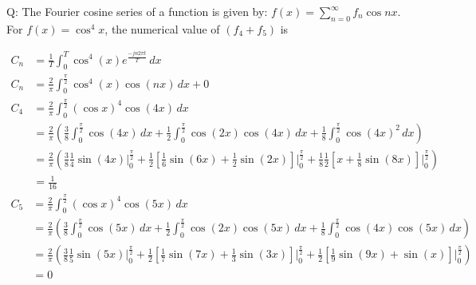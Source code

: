 \documentclass[journal,12pt,onecolumn]{IEEEtran}
\theoremstyle{remark}
\begin{document}
\let\vec\mathbf







\bigskip


Q: The Fourier cosine series of a function is given by: $f(x) = \sum_{n=0}^{\infty} f_{n}\cos{nx}$. For $f(x) = \cos^{4}x$, the numerical value of $(f_{4} + f_{5})$ is
 
\solution
\begin{table}[h]

\end{table}
\begin{align}
C_n &= \frac{1}{T} \int_{0}^{T} \cos^4(x) e^{\frac{-jn2\pi t}{T}} \,dx \\
    C_n &= \frac{2}{\pi} \int_{0}^{\frac{\pi}{2}} \cos^4(x) \cos(nx) \,dx + 0 \\
   C_4 &= \frac{2}{\pi} \int_{0}^{\frac{\pi}{2}} (\cos x)^4 \cos(4x) \, dx \\
&= \frac{2}{\pi} \left( \frac{3}{8} \int_{0}^{\frac{\pi}{2}} \cos(4x) \, dx + \frac{1}{2} \int_{0}^{\frac{\pi}{2}} \cos(2x) \cos(4x) \, dx + \frac{1}{8} \int_{0}^{\frac{\pi}{2}} \cos(4x)^2 \, dx \right) \\
&= \frac{2}{\pi} \left( \frac{3}{8} \frac{1}{4} \sin(4x) \Bigg|_{0}^{\frac{\pi}{2}} + \frac{1}{2} \left[\frac{1}{6} \sin(6x) + \frac{1}{2}\sin(2x) \right] \Bigg|_{0}^{\frac{\pi}{2}} + \frac{1}{8} \frac{1}{2} \left[ x + \frac{1}{8} \sin(8x) \right] \Bigg|_{0}^{\frac{\pi}{2}}  \right) \\
&=\frac{1}{16}
\end{align}
\begin{align}
    C_5 &= \frac{2}{\pi} \int_{0}^{\frac{\pi}{2}} (\cos x)^4 \cos(5x) \, dx \\
&= \frac{2}{\pi} \left( \frac{3}{8} \int_{0}^{\frac{\pi}{2}} \cos(5x) \, dx + \frac{1}{2} \int_{0}^{\frac{\pi}{2}} \cos(2x) \cos(5x) \, dx + \frac{1}{8} \int_{0}^{\frac{\pi}{2}} \cos(4x) \cos(5x) \, dx \right) \\
&= \frac{2}{\pi} \left(\frac{3}{8} \frac{1}{5} \sin(5x) \Bigg|_{0}^{\frac{\pi}{2}} + \frac{1}{2} \left[ \frac{1}{7} \sin(7x) + \frac{1}{3} \sin(3x) \right] \Bigg|_{0}^{\frac{\pi}{2}} + \frac{1}{2} \left[ \frac{1}{9} \sin(9x) + \sin(x) \right] \Bigg|_{0}^{\frac{\pi}{2}} \right) \\
&= 0 
\end{align}
\end{document}
